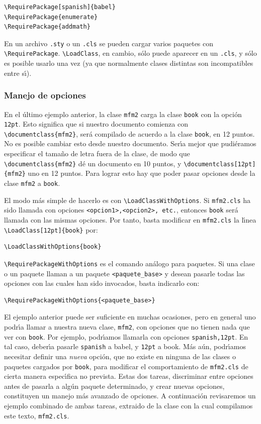 {\begin{verbatim}
\RequirePackage[spanish]{babel}
\RequirePackage{enumerate}
\RequirePackage{addmath}
\end{verbatim}

En un archivo \verb+.sty+ o un \verb+.cls+ se pueden cargar varios
paquetes con \verb+\RequirePackage+. \verb+\LoadClass+, en cambio,
s\'olo puede aparecer en un \verb+.cls+, y s\'olo es posible usarlo
una vez (ya que normalmente clases distintas son incompatibles entre
s\'{\i}). 

\subsubsection{Manejo de opciones}

En el \'ultimo ejemplo anterior, la clase \verb+mfm2+ carga la clase
\verb+book+ con la opci\'on \verb+12pt+. Esto significa que si nuestro
documento comienza con \verb+\documentclass{mfm2}+, ser\'a compilado
de acuerdo a la clase \verb+book+, en 12 puntos. No es posible cambiar
esto desde nuestro documento. Ser\'{\i}a mejor que pudi\'eramos
especificar el tama\~no de letra fuera de la clase, de modo que
\verb+\documentclass{mfm2}+ d\'e un documento en 10 puntos, y
\verb+\documentclass[12pt]{mfm2}+ uno en 12 puntos. Para lograr esto
hay que poder pasar opciones desde la clase \verb+mfm2+ a
\verb+book+. 

El modo m\'as simple de hacerlo es con
\verb+\LoadClassWithOptions+. Si \verb+mfm2.cls+ ha sido llamada con
opciones \verb+<opcion1>,<opcion2>, etc.+, entonces \verb+book+ ser\'a
llamada con las mismas opciones. Por tanto, basta modificar en
\verb+mfm2.cls+ la l\'{\i}nea \verb+\LoadClass[12pt]{book}+ por:
\begin{verbatim}
\LoadClassWithOptions{book}
\end{verbatim}


\verb+\RequirePackageWithOptions+ es el comando an\'alogo para
paquetes. Si una clase o un paquete llaman a un paquete
\verb+<paquete_base>+  y desean
pasarle todas las opciones con las cuales han sido invocados, basta
indicarlo con:
\begin{verbatim}
\RequirePackageWithOptions{<paquete_base>}
\end{verbatim}

El ejemplo anterior puede ser suficiente en muchas ocasiones, pero en
general uno podr\'{\i}a llamar a nuestra nueva clase, \verb+mfm2+, con
opciones que no tienen nada que ver con \verb+book+. Por ejemplo,
podr\'{\i}amos llamarla con opciones \verb+spanish,12pt+. En tal caso,
deber\'{\i}a pasarle \verb+spanish+ a babel, y \verb+12pt+ a
book. M\'as a\'un, podr\'{\i}amos necesitar definir una {\em nueva\/}
opci\'on, que no existe en ninguna de las clases o paquetes cargados
por \verb+book+, para modificar el comportamiento de \verb+mfm2.cls+
de cierta manera espec\'{\i}fica no prevista. Estas dos tareas,
discriminar entre opciones antes de pasarla a alg\'un paquete
determinado, y crear nuevas opciones, constituyen un manejo m\'as
avanzado de opciones. A continuaci\'on revisaremos un ejemplo
combinado de ambas tareas, extraido de la clase con la cual compilamos
este texto, \verb+mfm2.cls+.

}
